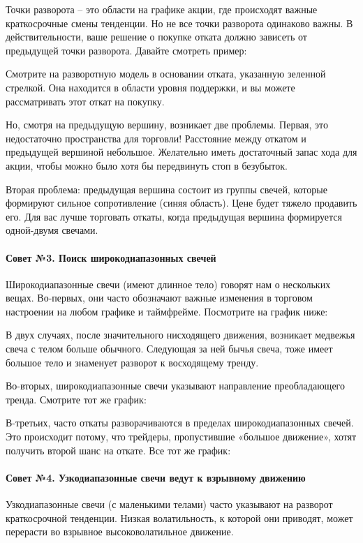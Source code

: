 \documentclass{book}
\begin{document}
Точки разворота – это области на графике акции, где происходят важные краткосрочные смены тенденции. Но не все точки разворота одинаково важны. В действительности, ваше решение о покупке отката должно зависеть от предыдущей точки разворота. Давайте смотреть пример:

Смотрите на разворотную модель в основании отката, указанную зеленной стрелкой. Она находится в области уровня поддержки, и вы можете рассматривать этот откат на покупку.

Но, смотря на предыдущую вершину, возникает две проблемы. Первая, это недостаточно пространства для торговли! Расстояние между откатом и предыдущей вершиной небольшое. Желательно иметь достаточный запас хода для акции, чтобы можно было хотя бы передвинуть стоп в безубыток.

Вторая проблема: предыдущая вершина состоит из группы свечей, которые
формируют сильное сопротивление (синяя область). Цене будет тяжело
продавить его. Для вас лучше торговать откаты, когда предыдущая
вершина формируется одной-двумя свечами.

\paragraph{Совет №3. Поиск широкодиапазонных свечей}

Широкодиапазонные свечи (имеют длинное тело) говорят нам о нескольких вещах. Во-первых, они часто обозначают важные изменения в торговом настроении на любом графике и таймфрейме. Посмотрите на график ниже:

В двух случаях, после значительного нисходящего движения, возникает медвежья свеча с телом больше обычного. Следующая за ней бычья свеча, тоже имеет большое тело и знаменует разворот к восходящему тренду.

Во-вторых, широкодиапазонные свечи указывают направление преобладающего тренда. Смотрите тот же график:

В-третьих, часто откаты разворачиваются в пределах широкодиапазонных
свечей. Это происходит потому, что трейдеры, пропустившие «большое
движение», хотят получить второй шанс на откате. Все тот же график:

\paragraph{Совет №4. Узкодиапазонные свечи ведут к взрывному
  движению}

Узкодиапазонные свечи (с маленькими телами) часто указывают на разворот краткосрочной тенденции. Низкая волатильность, к которой они приводят, может перерасти во взрывное высоковолатильное движение.
\end{document}
